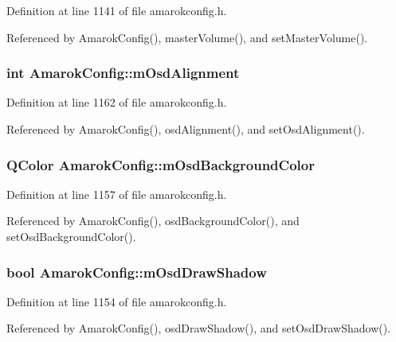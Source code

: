 Definition at line 1141 of file amarokconfig.h.

Referenced by Amarok\-Config(), master\-Volume(), and set\-Master\-Volume().
\subsubsection{\setlength{\rightskip}{0pt plus 5cm}int {\bf Amarok\-Config::m\-Osd\-Alignment}\hspace{0.3cm}{\tt  [protected]}}\label{classAmarokConfig_AmarokConfigp44}




Definition at line 1162 of file amarokconfig.h.

Referenced by Amarok\-Config(), osd\-Alignment(), and set\-Osd\-Alignment().
\subsubsection{\setlength{\rightskip}{0pt plus 5cm}QColor {\bf Amarok\-Config::m\-Osd\-Background\-Color}\hspace{0.3cm}{\tt  [protected]}}\label{classAmarokConfig_AmarokConfigp39}




Definition at line 1157 of file amarokconfig.h.

Referenced by Amarok\-Config(), osd\-Background\-Color(), and set\-Osd\-Background\-Color().
\subsubsection{\setlength{\rightskip}{0pt plus 5cm}bool {\bf Amarok\-Config::m\-Osd\-Draw\-Shadow}\hspace{0.3cm}{\tt  [protected]}}\label{classAmarokConfig_AmarokConfigp36}




Definition at line 1154 of file amarokconfig.h.

Referenced by Amarok\-Config(), osd\-Draw\-Shadow(), and set\-Osd\-Draw\-Shadow().
